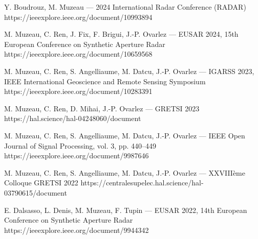 \documentclass[10pt,a4paper]{article}
\begin{document}
    {Y. Boudrouz, M. Muzeau --- 2024 International Radar Conference (RADAR)}
    {https://ieeexplore.ieee.org/document/10993894}

    {M. Muzeau, C. Ren, J. Fix, F. Brigui, J.-P. Ovarlez --- EUSAR 2024, 15th European Conference on Synthetic Aperture Radar}
    {https://ieeexplore.ieee.org/document/10659568}

    {M. Muzeau, C. Ren, S. Angelliaume, M. Datcu, J.-P. Ovarlez --- IGARSS 2023, IEEE International Geoscience and Remote Sensing Symposium}
    {https://ieeexplore.ieee.org/document/10283391}

    {M. Muzeau, C. Ren, D. Mihai, J.-P. Ovarlez --- GRETSI 2023}
    {https://hal.science/hal-04248060/document}

    {M. Muzeau, C. Ren, S. Angelliaume, M. Datcu, J.-P. Ovarlez --- IEEE Open Journal of Signal Processing, vol. 3, pp. 440--449}
    {https://ieeexplore.ieee.org/document/9987646}

    {M. Muzeau, C. Ren, S. Angelliaume, M. Datcu, J.-P. Ovarlez --- XXVIII\`eme Colloque GRETSI 2022}
    {https://centralesupelec.hal.science/hal-03790615/document}

    {E. Dalsasso, L. Denis, M. Muzeau, F. Tupin --- EUSAR 2022, 14th European Conference on Synthetic Aperture Radar}
    {https://ieeexplore.ieee.org/document/9944342}
\end{document}
